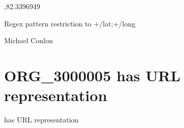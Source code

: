 \documentclass[letterpaper,10pt,english]{sphinxmanual}
\begin{document}
\begin{sphinxShadowBox}

\sphinxAtStartPar
{\hyperref[\detokenize{doc-ORG_0000044::doc}]{}}
\end{sphinxShadowBox}

\begin{sphinxShadowBox}

\sphinxAtStartPar
{}
\end{sphinxShadowBox}

\begin{sphinxShadowBox}

,\sphinxhyphen{}82.3396949
\end{sphinxShadowBox}

\begin{sphinxShadowBox}

\sphinxAtStartPar
Regex pattern restriction to +/\sphinxhyphen{}lat;+/\sphinxhyphen{}long
\end{sphinxShadowBox}

\begin{sphinxShadowBox}

\sphinxAtStartPar
Michael Conlon 
\end{sphinxShadowBox}
\begin{quote}

\ignorespaces \end{quote}


\section{ORG\_3000005 \sphinxhyphen{} has URL representation}
\label{\detokenize{doc-ORG_3000005:org-3000005-has-url-representation}}\label{\detokenize{doc-ORG_3000005:index-0}}\label{\detokenize{doc-ORG_3000005::doc}}
\begin{sphinxShadowBox}

\sphinxAtStartPar
has URL representation
\end{sphinxShadowBox}
\end{document}
